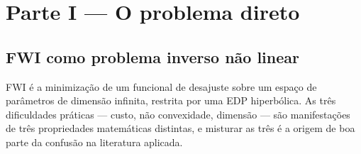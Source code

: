 \documentclass[11pt,a4paper,oneside]{report}
\begin{document}
\part*{\centering\color{azulfwi} Parte I --- O problema direto}

\chapter{FWI como problema inverso n\~ao linear}
\label{cap:oque}

\begin{ideia}
FWI \'e a minimiza\c{c}\~ao de um funcional de desajuste sobre um espa\c{c}o
de par\^ametros de dimens\~ao infinita, restrita por uma EDP hiperb\'olica. As
tr\^es dificuldades pr\'aticas --- custo, n\~ao convexidade, dimens\~ao ---
s\~ao manifesta\c{c}\~oes de tr\^es propriedades matem\'aticas distintas, e
misturar as tr\^es \'e a origem de boa parte da confus\~ao na literatura
aplicada.
\end{ideia}
\end{document}
